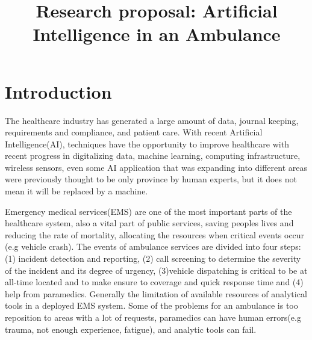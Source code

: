 \documentclass[fleqn,10pt]{wlscirep}
\title{Research proposal: Artificial Intelligence in an Ambulance}
\author{}
\begin{document}



\tableofcontents
\twocolumn
\flushbottom
\maketitle

\section{Introduction}
 The healthcare industry has generated a large amount of data, journal keeping, requirements and compliance, and patient care\cite{Kilde3}. With recent Artificial Intelligence(AI), techniques have the opportunity to improve healthcare with recent progress in digitalizing data, machine learning, computing infrastructure, wireless sensors, even some AI application that was expanding into different areas were previously thought to be only province by human experts, but it does not mean it will be replaced by a machine\cite{Kilde4}. 
 
Emergency medical services(EMS) are one of the most important parts of the healthcare system, also a vital part of public services, saving peoples lives and reducing the rate of mortality, allocating the resources when critical events occur (e.g vehicle crash). The events of ambulance services are divided into four steps\cite{Kilde1}: (1) incident detection and reporting, (2) call screening to determine the severity of the incident and its degree of urgency, (3)vehicle dispatching is critical to be at all-time located and to make ensure to coverage and quick response time and (4) help from paramedics. Generally the limitation of available resources of analytical tools in a deployed EMS system. Some of the problems for an ambulance is too reposition to areas with a lot of requests, paramedics can have human errors\cite{Kilde2}(e.g trauma, not enough experience, fatigue), and analytic tools can fail. 
\end{document}
